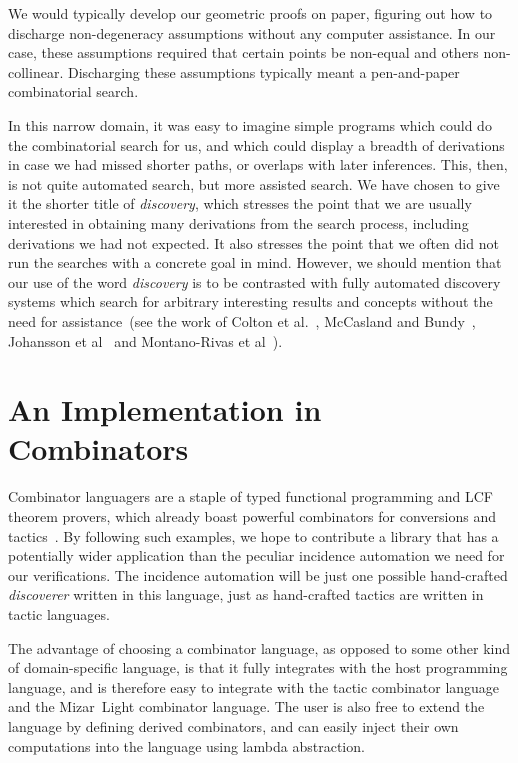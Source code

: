 We would typically develop our geometric proofs on paper, figuring out how to discharge non-degeneracy assumptions without any computer assistance. In our case, these assumptions required that certain points be non-equal and others non-collinear. Discharging these assumptions typically meant a pen-and-paper combinatorial search.

In this narrow domain, it was easy to imagine simple programs which could do the combinatorial search for us, and which could display a breadth of derivations in case we had missed shorter paths, or overlaps with later inferences. This, then, is not quite automated search, but more assisted search. We have chosen to give it the shorter title of \emph{discovery}, which stresses the point that we are usually interested in obtaining many derivations from the search process, including derivations we had not expected. It also stresses the point that we often did not run the searches with a concrete goal in mind. However, we should mention that our use of the word \emph{discovery} is to be contrasted with fully automated discovery systems which search for arbitrary interesting results and concepts without the need for assistance~(see the work of Colton et al.~\cite{ColtonInterestingness,MathematicalDiscovery}, McCasland and Bundy~\cite{Mathsaid}, Johansson et al~\cite{ConjectureSynthesis} and Montano-Rivas et al~\cite{SchemeBasedSynthesis,SchemeBasedConceptInvention}).

\section{An Implementation in Combinators}\label{sec:DiscoveryAlgebra}
Combinator languagers are a staple of typed functional programming and LCF theorem provers, which already boast powerful combinators for conversions and tactics~\cite{Tactics}. By following such examples, we hope to contribute a library that has a potentially wider application than the peculiar incidence automation we need for our verifications. The incidence automation will be just one possible hand-crafted \emph{discoverer} written in this language, just as hand-crafted tactics are written in tactic languages.

The advantage of choosing a combinator language, as opposed to some other kind of domain-specific language, is that it fully integrates with the host programming language, and is therefore easy to integrate with the tactic combinator language and the Mizar~Light combinator language. The user is also free to extend the language by defining derived combinators, and can easily inject their own computations into the language using lambda abstraction.

